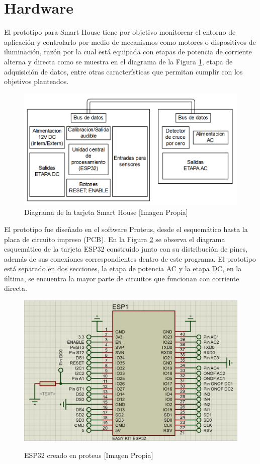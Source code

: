 \section{Hardware}\label{sec:hw}

El prototipo para Smart House tiene por objetivo monitorear el entorno de aplicación y controlarlo por medio de mecanismos como motores o dispositivos de iluminación, razón por la cual está equipada con etapas de potencia de corriente alterna y directa como se muestra en el diagrama de la Figura \ref{fig:tar}, etapa de adquisición de datos, entre otras características que permitan cumplir con los objetivos planteados.\\

\begin{figure}[H]
	\centering
	\includegraphics[width=0.7\linewidth]{Imagenes/Tarjeta}
	\caption{Diagrama de la tarjeta Smart House [Imagen Propia]}
	\label{fig:tar}
\end{figure}


El prototipo fue diseñado en el software Proteus, desde el esquemático hasta la placa de circuito impreso (PCB). En la Figura \ref{fig:esp32} se observa el diagrama esquemático de la tarjeta ESP32 construido junto con su distribución de pines, además de sus conexiones correspondientes dentro de este programa. El prototipo está separado en dos secciones, la etapa de potencia AC y la etapa DC, en la última, se encuentra la mayor parte de circuitos que funcionan con corriente directa.\\

\begin{figure}[H]
	\centering
	\caption{ESP32 creado en proteus [Imagen Propia]}
	\includegraphics[width=0.5\linewidth]{Imagenes/ESP32}	
	\label{fig:esp32}
\end{figure}

